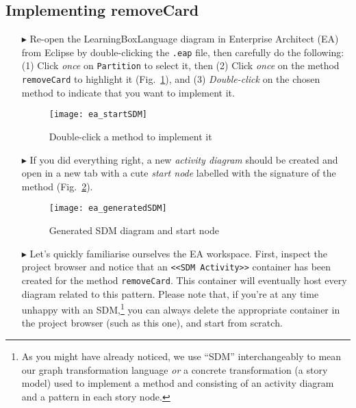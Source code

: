\newpage
\hypertarget{remCard vis}{}
\subsection{Implementing removeCard}
\visHeader

\begin{itemize}

\item[$\blacktriangleright$] Re-open the LearningBoxLanguage diagram in Enterprise Architect (EA) from Eclipse by double-clicking the \texttt{.eap}
file, then carefully do the following: (1) Click \emph{once} on \texttt{Partition} to select it, then (2) Click \emph{once} on the method
\texttt{removeCard} to highlight it (Fig.~\ref{fig:sdm_start}), and (3) \emph{Double-click} on the chosen method to indicate that you want to implement it.

\begin{figure}[htp]
\begin{center}
  \texttt{[image: ea\_startSDM]}
  \caption{Double-click a method to implement it}  
  \label{fig:sdm_start}
\end{center}
\end{figure}
 
\item[$\blacktriangleright$] If you did everything right, a new \emph{activity diagram} should be created and open in a new tab with a cute \emph{start node} 
labelled with the signature of the method (Fig.~\ref{fig:sdm_skeleton}).  

\begin{figure}[htp]
\begin{center}
 \texttt{[image: ea\_generatedSDM]}
  \caption{Generated SDM diagram and start node}  
  \label{fig:sdm_skeleton}
\end{center}
\end{figure}

\vspace{0.5cm}

\item[$\blacktriangleright$] Let's quickly familiarise ourselves the EA workspace. First, inspect the project browser and notice that an \texttt{<<SDM
Activity>>} container has been created for the method \texttt{removeCard}. This container will eventually host every diagram related to this pattern. Please
note that, if you're at any time unhappy with an SDM,\footnote{As you might have already noticed, we use ``SDM'' interchangeably to mean our graph
transformation language \emph{or} a concrete transformation (a story model) used to implement a method and consisting of an activity diagram and a pattern in
each story node.} you can always delete the appropriate container in the project browser (such as this one), and start from scratch.


\end{itemize}
